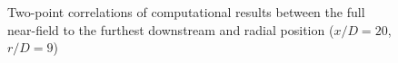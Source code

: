 \documentclass[english]{aiaa-tc}
\begin{document}
\begin{figure}
	\centering{}

	\caption{Two-point correlations of computational results between the full near-field to the furthest downstream and radial position ($x/D=20$, $r/D=9$)}\label{Num_2ptcorr}
\end{figure}

\end{document}
